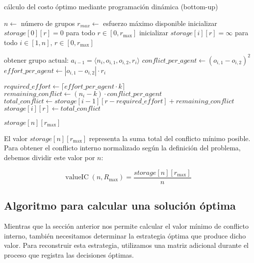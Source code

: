 \begin{algorithm}[H]
	\caption{cálculo del costo óptimo mediante programación dinámica (bottom-up)}
	\begin{algorithmic}[1]
		\State $n \gets$ número de grupos
		\State $r_{max} \gets$ esfuerzo máximo disponible
		\State inicializar $storage[0][r] = 0$ para todo $r \in [0,r_{ \max }]$
		\State inicializar $storage[i][r] = \infty$ para todo $i \in [1,n]$, $r \in [0, r_{ \max }]$

			\State obtener grupo actual: $a_{ i - 1 } = \langle n_i,o_{ i,1 },o_{ i,2 },r_i \rangle$
			\State $conflict\_per\_agent \gets (o_{ i,1 } - o_{ i,2 })^2$
			\State $effort\_per\_agent \gets |o_{ i,1 } - o_{ i,2 }| \cdot r_i$

					\State $required\_effort \gets \lceil effort\_per\_agent \cdot k \rceil$
						\State $remaining\_conflict \gets (n_i - k) \cdot conflict\_per\_agent$
						\State $total\_conflict \gets storage[i - 1][r-required\_effort] + remaining\_conflict$
							\State $storage[i][r] \gets total\_conflict$
						\EndIf
					\EndIf
				\EndFor
			\EndFor
		\EndFor

		\State \Return $storage[n][r_{ \max }]$
	\end{algorithmic}
\end{algorithm}

El valor $storage[n][r_{ \max }]$ representa la suma total del conflicto mínimo posible. Para obtener el conflicto interno normalizado según la definición del problema, debemos dividir este valor por $n$:

\begin{equation}
	\operatorname{ valueIC }(n,R_{ \max }) = \frac{ storage[n][r_{ \max }] }{ n }
\end{equation}

\subsection{Algoritmo para calcular una solución óptima}

Mientras que la sección anterior nos permite calcular el valor mínimo de conflicto interno, también necesitamos determinar la estrategia óptima que produce dicho valor. Para reconstruir esta estrategia, utilizamos una matriz adicional durante el proceso que registra las decisiones óptimas.

